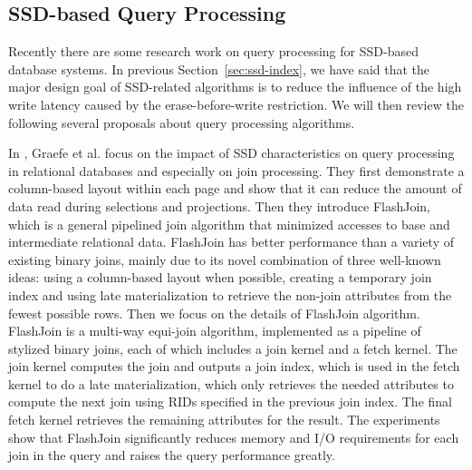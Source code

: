 \subsection{SSD-based Query Processing}
Recently there are some research work on query processing for SSD-based database systems. In previous Section~\ref{sec:ssd-index}, we have said that the major design goal of SSD-related algorithms is to reduce the influence of the high write latency caused by the erase-before-write restriction. We will then review the following several proposals about query processing algorithms.

In \cite{tsirogiannis2009query}, Graefe et al. focus on the impact of SSD characteristics on query processing in relational databases and especially on join processing. They first demonstrate a column-based layout within each page and show that it can reduce the amount of data read during selections and projections. Then they introduce FlashJoin, which is a general pipelined join algorithm that minimized accesses to base and intermediate relational data. FlashJoin has better performance than a variety of existing binary joins, mainly due to its novel combination of three well-known ideas: using a column-based layout when possible, creating a temporary join index and using late materialization to retrieve the non-join attributes from the fewest possible rows. Then we focus on the details of FlashJoin algorithm. FlashJoin is a multi-way equi-join algorithm, implemented as a pipeline of stylized binary joins, each of which includes a join kernel and a fetch kernel. The join kernel computes the join and outputs a join index, which is used in the fetch kernel to do a late materialization, which only retrieves the needed attributes to compute the next join using RIDs specified in the previous join index. The final fetch kernel retrieves the remaining attributes for the result. The experiments show that FlashJoin significantly reduces memory and I/O requirements for each join in the query and raises the query performance greatly.

